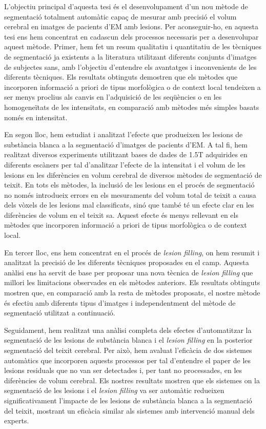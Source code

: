 L'objectiu principal d'aquesta tesi és el desenvolupament d'un nou mètode de segmentació totalment automàtic capaç de mesurar amb precisió el volum cerebral en imatges de pacients d'EM amb lesions. Per aconseguir-ho, en aquesta tesi ens hem concentrat en cadascun dels processos necessaris per a desenvolupar aquest mètode. Primer, hem fet un resum qualitatiu i quantitatiu de les tècniques de segmentació ja existents a la literatura utilitzant diferents conjunts d'imatges de subjectes sans, amb l'objectiu d'entendre els avantatges i inconvenients de les diferents tècniques. Els resultats obtinguts demostren que els mètodes que incorporen informació a priori de tipus morfològica o de context local tendeixen a ser menys proclius als canvis en l'adquisició de les seqüències o en les homogeneïtats de les intensitats, en comparació amb mètodes més simples basats només en intensitat.

En segon lloc, hem estudiat i analitzat l'efecte que produeixen les lesions de substància blanca a la segmentació d'imatges de pacients d'EM. A tal fi, hem realitzat diversos experiments utilitzant bases de dades de 1.5T adquirides en diferents escàners per tal d'analitzar l'efecte de la intensitat i el volum de les lesions en les diferències en volum cerebral de diversos mètodes de segmentació de teixit. En tots els mètodes, la inclusió de les lesions en el procés de segmentació no només  introdueix errors en els mesuraments del volum total de teixit a causa dels vòxels de les lesions mal classificats, sinó que també té un efecte clar en les diferències de volum en el teixit sa. Aquest efecte és menys rellevant en els mètodes que incorporen informació a priori de tipus morfològica o de context local.

En tercer lloc, ens hem concentrat en el procés de \textit{lesion filling}, on hem resumit i analitzat la precisió de les diferents tècniques proposades en el camp. Aquesta anàlisi ens ha servit de base per proposar una nova tècnica de \textit{lesion filling} que millori les limitacions observades en els mètodes anteriors. Els resultats obtinguts mostren que, en comparació amb la resta de mètodes proposats, el nostre mètode és efectiu amb diferents tipus d'imatges i independentment del mètode de segmentació utilitzat a continuació.

Seguidament, hem realitzat una anàlisi completa dels efectes d'automatitzar la segmentació de les lesions de substància blanca i el \textit{lesion filling}
en la posterior segmentació del teixit cerebral. Per això, hem avaluat l'eficàcia de dos sistemes automàtics que incorporen aquests processos per tal d'entendre el paper de les lesions residuals que no van ser detectades i, per tant no processades, en les diferències de volum cerebral. Els nostres resultats mostren que els sistemes on la segmentació de les lesions i el \textit{lesion filling} va ser automàtic redueixen significativament l'impacte de les lesions de substància blanca a la segmentació del teixit, mostrant un eficàcia similar als sistemes amb intervenció manual dels experts.

